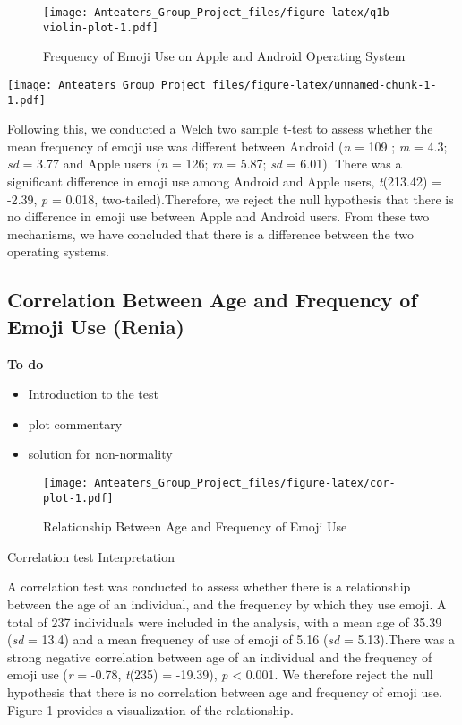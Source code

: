 \documentclass[
]{article}
\providecommand{\tightlist}{%
  \setlength{\itemsep}{0pt}\setlength{\parskip}{0pt}}
\begin{document}
\begin{figure}
\centering
\texttt{[image: Anteaters\_Group\_Project\_files/figure-latex/q1b-violin-plot-1.pdf]}
\caption{\label{fig:q1b-violin-plot}Frequency of Emoji Use on Apple and Android Operating System}
\end{figure}

\texttt{[image: Anteaters\_Group\_Project\_files/figure-latex/unnamed-chunk-1-1.pdf]}

Following this, we conducted a Welch two sample t-test to assess whether the mean frequency of emoji use was different between Android (\emph{n} = 109 ; \emph{m} = 4.3; \emph{sd} = 3.77 and Apple users (\emph{n} = 126; \emph{m} = 5.87; \emph{sd} = 6.01). There was a significant difference in emoji use among Android and Apple users, \emph{t}(213.42) = -2.39, \emph{p} = 0.018, two-tailed).Therefore, we reject the null hypothesis that there is no difference in emoji use between Apple and Android users. From these two mechanisms, we have concluded that there is a difference between the two operating systems.

\hypertarget{correlation-between-age-and-frequency-of-emoji-use-renia}{%
\subsection{Correlation Between Age and Frequency of Emoji Use (Renia)}\label{correlation-between-age-and-frequency-of-emoji-use-renia}}

\textbf{To do}

\begin{itemize}
\tightlist
\item
  Introduction to the test
\item
  plot commentary
\item
  solution for non-normality
\end{itemize}

\begin{figure}
\centering
\texttt{[image: Anteaters\_Group\_Project\_files/figure-latex/cor-plot-1.pdf]}
\caption{\label{fig:cor-plot}Relationship Between Age and Frequency of Emoji Use}
\end{figure}

Correlation test Interpretation

A correlation test was conducted to assess whether there is a relationship between the age of an individual, and the frequency by which they use emoji. A total of 237 individuals were included in the analysis, with a mean age of 35.39 (\emph{sd} = 13.4) and a mean frequency of use of emoji of 5.16 (\emph{sd} = 5.13).There was a strong negative correlation between age of an individual and the frequency of emoji use (\emph{r} = -0.78, \emph{t}(235) = -19.39), \emph{p} \textless{} 0.001. We therefore reject the null hypothesis that there is no correlation between age and frequency of emoji use. Figure 1 provides a visualization of the relationship.
\end{document}
